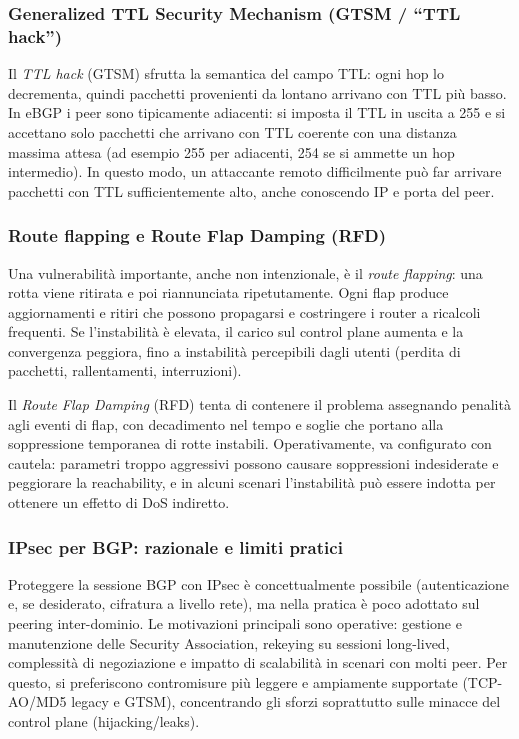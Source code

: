 \subsubsection{Generalized TTL Security Mechanism (GTSM / ``TTL hack'')}
Il \emph{TTL hack} (GTSM) sfrutta la semantica del campo TTL: ogni hop lo decrementa, quindi pacchetti provenienti da lontano arrivano con TTL più basso. In eBGP i peer sono tipicamente adiacenti: si imposta il TTL in uscita a 255 e si accettano solo pacchetti che arrivano con TTL coerente con una distanza massima attesa (ad esempio 255 per adiacenti, 254 se si ammette un hop intermedio). In questo modo, un attaccante remoto difficilmente può far arrivare pacchetti con TTL sufficientemente alto, anche conoscendo IP e porta del peer.

\subsubsection{Route flapping e Route Flap Damping (RFD)}
Una vulnerabilità importante, anche non intenzionale, è il \emph{route flapping}: una rotta viene ritirata e poi riannunciata ripetutamente. Ogni flap produce aggiornamenti e ritiri che possono propagarsi e costringere i router a ricalcoli frequenti. Se l’instabilità è elevata, il carico sul control plane aumenta e la convergenza peggiora, fino a instabilità percepibili dagli utenti (perdita di pacchetti, rallentamenti, interruzioni).

Il \emph{Route Flap Damping} (RFD) tenta di contenere il problema assegnando penalità agli eventi di flap, con decadimento nel tempo e soglie che portano alla soppressione temporanea di rotte instabili. Operativamente, va configurato con cautela: parametri troppo aggressivi possono causare soppressioni indesiderate e peggiorare la reachability, e in alcuni scenari l’instabilità può essere indotta per ottenere un effetto di DoS indiretto.

\subsubsection{IPsec per BGP: razionale e limiti pratici}
Proteggere la sessione BGP con IPsec è concettualmente possibile (autenticazione e, se desiderato, cifratura a livello rete), ma nella pratica è poco adottato sul peering inter-dominio. Le motivazioni principali sono operative: gestione e manutenzione delle Security Association, rekeying su sessioni long-lived, complessità di negoziazione e impatto di scalabilità in scenari con molti peer. Per questo, si preferiscono contromisure più leggere e ampiamente supportate (TCP-AO/MD5 legacy e GTSM), concentrando gli sforzi soprattutto sulle minacce del control plane (hijacking/leaks).

